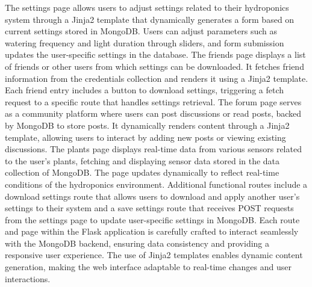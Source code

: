 \documentclass[12pt]{article} %
\begin{document}
\newline
\newline
\noindent The settings page allows users to adjust settings related to their hydroponics system through a Jinja2 template that dynamically generates a form based on current settings stored in MongoDB. Users can adjust parameters such as watering frequency and light duration through sliders, and form submission updates the user-specific settings in the database.
\newline
\newline
\noindent The friends page displays a list of friends or other users from which settings can be downloaded. It fetches friend information from the credentials collection and renders it using a Jinja2 template. Each friend entry includes a button to download settings, triggering a fetch request to a specific route that handles settings retrieval.
\newline
\newline
\noindent The forum page serves as a community platform where users can post discussions or read posts, backed by MongoDB to store posts. It dynamically renders content through a Jinja2 template, allowing users to interact by adding new posts or viewing existing discussions. The plants page displays real-time data from various sensors related to the user’s plants, fetching and displaying sensor data stored in the data collection of MongoDB. The page updates dynamically to reflect real-time conditions of the hydroponics environment.
\newline
\newline
\noindent Additional functional routes include a download settings route that allows users to download and apply another user's settings to their system and a save settings route that receives POST requests from the settings page to update user-specific settings in MongoDB. Each route and page within the Flask application is carefully crafted to interact seamlessly with the MongoDB backend, ensuring data consistency and providing a responsive user experience. The use of Jinja2 templates enables dynamic content generation, making the web interface adaptable to real-time changes and user interactions.
\newline
\newline
\end{document}
